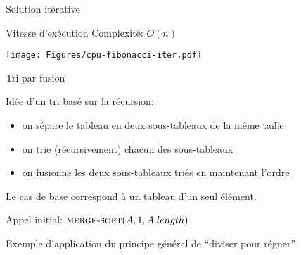 \begin{frame}{Solution itérative}

\begin{center}
\end{center}


\end{frame}

\begin{frame}{Vitesse d'exécution}
Complexité: $O(n)$

\bigskip

\centerline{\texttt{[image: Figures/cpu-fibonacci-iter.pdf]}}

\end{frame}

\begin{frame}{Tri par fusion}

Idée d'un tri basé sur la récursion:
\begin{itemize}
\item on sépare le tableau en deux sous-tableaux de la même taille
\item on trie (récursivement) chacun des sous-tableaux
\item on fusionne les deux sous-tableaux triés en maintenant l'ordre
\end{itemize}
Le cas de base correspond à un tableau d'un seul élément.

\bigskip

\begin{center}
\end{center}

\centerline{Appel initial: $\textnormal{\scshape merge-sort}(A,1,A.length)$}

\bigskip

Exemple d'application du principe général de ``\alert{diviser pour régner}''


\end{frame}

